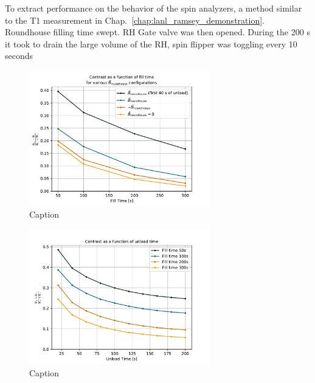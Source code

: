  To extract performance on the behavior of the spin analyzers, a method similar to the T1 measurement in Chap.~\ref{chap:lanl_ramsey_demonstration}. Roundhouse filling time swept. RH Gate valve was then opened. During the 200 s it took to drain the large volume of the RH, spin flipper was toggling every 10 seconds

 \begin{figure}
    \centering
    \includegraphics[width=0.7\textwidth]{figures/2021_roundhouse_asymmetry_1.pdf}
    \caption{Caption}\label{fig:2021_roundhouse_asymmetry_1}
\end{figure}

\begin{figure}
    \centering
    \includegraphics[width=0.7\textwidth]{figures/2021_roundhouse_asymmetry_2.pdf}
    \caption{Caption}\label{fig:2021_roundhouse_asymmetry_2}
\end{figure}